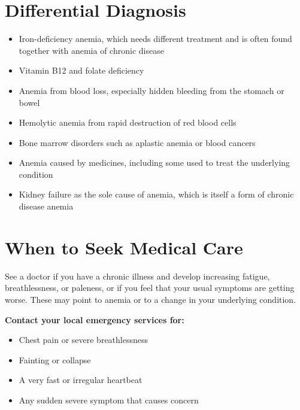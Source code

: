 \section*{Differential Diagnosis}
\begin{itemize}
    \item Iron-deficiency anemia, which needs different treatment and is often found together with anemia of chronic disease
    \item Vitamin B12 and folate deficiency
    \item Anemia from blood loss, especially hidden bleeding from the stomach or bowel
    \item Hemolytic anemia from rapid destruction of red blood cells
    \item Bone marrow disorders such as aplastic anemia or blood cancers
    \item Anemia caused by medicines, including some used to treat the underlying condition
    \item Kidney failure as the sole cause of anemia, which is itself a form of chronic disease anemia
\end{itemize}

\section*{When to Seek Medical Care}
See a doctor if you have a chronic illness and develop increasing fatigue, breathlessness, or paleness, or if you feel that your usual symptoms are getting worse. These may point to anemia or to a change in your underlying condition.

\textbf{Contact your local emergency services for:}
\begin{itemize}
    \item Chest pain or severe breathlessness
    \item Fainting or collapse
    \item A very fast or irregular heartbeat
    \item Any sudden severe symptom that causes concern
\end{itemize}

